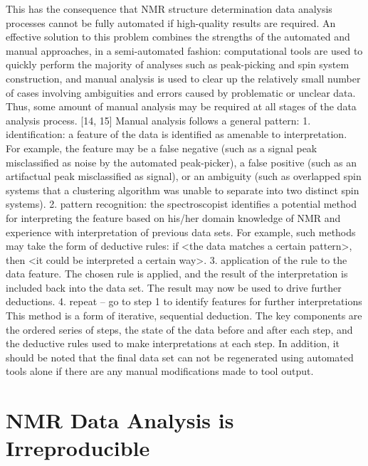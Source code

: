 \documentclass[a4paper]{report}
\begin{document}
This has the consequence that NMR structure determination data analysis processes cannot be fully automated if high-quality results are required.  An effective solution to this problem combines the strengths of the automated and manual approaches, in a semi-automated fashion:  computational tools are used to quickly perform the majority of analyses such as peak-picking and spin system construction, and manual analysis is used to clear up the relatively small number of cases involving ambiguities and errors caused by problematic or unclear data.  Thus, some amount of manual analysis may be required at all stages of the data analysis process.  [14, 15]   Manual analysis follows a general pattern:
  1. identification: a feature of the data is identified as amenable to interpretation.  For example, the feature may be a false negative (such as a signal peak misclassified as noise by the automated peak-picker), a false positive (such as an artifactual peak misclassified as signal), or an ambiguity (such as overlapped spin systems that a clustering algorithm was unable to separate into two distinct spin systems).
  2. pattern recognition: the spectroscopist identifies a potential method for interpreting the feature based on his/her domain knowledge of NMR and experience with interpretation of previous data sets.  For example, such methods may take the form of deductive rules:  if <the data matches a certain pattern>, then <it could be interpreted a certain way>.
  3. application of the rule to the data feature.  The chosen rule is applied, and the result of the interpretation is included back into the data set.  The result may now be used to drive further deductions.
  4. repeat -- go to step 1 to identify features for further interpretations
This method is a form of iterative, sequential deduction.  The key components are the ordered series of steps, the state of the data before and after each step, and the deductive rules used to make interpretations at each step.  In addition, it should be noted that the final data set can not be regenerated using automated tools alone if there are any manual modifications made to tool output.



\chapter{NMR Data Analysis is Irreproducible}

%


\end{document}
